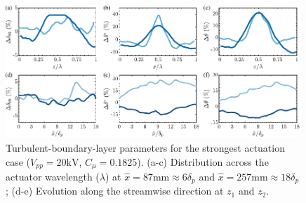 \begin{figure}
    \centering
    \includegraphics[width = 0.99\textwidth]{figures/results/stereo/TBLstats_xz.pdf}
    \caption{Turbulent-boundary-layer parameters for the strongest actuation case ($V_{pp} = 20 \mathrm{kV}$, $C_\mu = 0.1825$). (a-c) Distribution across the actuator wavelength ($\lambda$) at $\hat{x} = 87\mathrm{mm} \approx 6\delta_p$  and $\hat{x} = 257\mathrm{mm} \approx 18\delta_p$ ; (d-e) Evolution along the streamwise direction at $z_1$  and $z_2$.}
    \label{fig:TBLstats_xz}
\end{figure}

